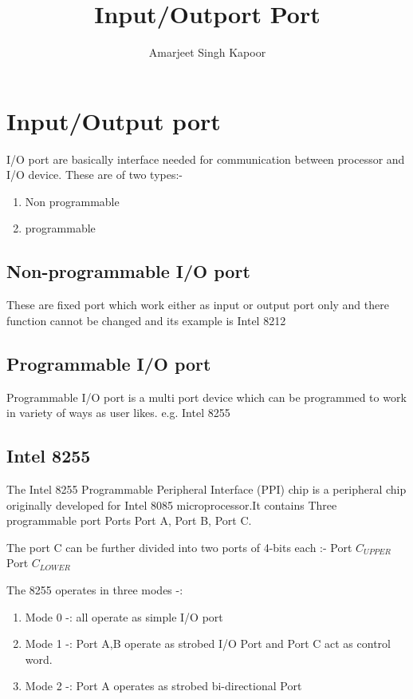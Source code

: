 \documentclass[12pt]{report}
\title{Input/Outport Port}
\author{Amarjeet Singh Kapoor}
\begin{document}
\thispagestyle{plain}
	\begin{titlepage}
\maketitle
	\end{titlepage}

\chapter{Input/Output port}
 I/O port are basically interface needed for communication between processor and I/O device.
These are of two types:-
\begin{enumerate}
\item Non programmable
\item  programmable
\end{enumerate}

\section{Non-programmable I/O port}
These are fixed port which work either as input or output port only and there function cannot be changed and its example is Intel 8212


\section{Programmable I/O port}
Programmable I/O port is a multi port device which can be programmed to work in variety of ways as user likes. e.g. Intel 8255   

\section{Intel 8255} 
The Intel 8255 Programmable Peripheral Interface (PPI) chip is a peripheral chip originally developed for Intel 8085 microprocessor.It contains Three programmable port Ports Port A, Port B, Port C. 


The port C can be further divided into two ports of 4-bits each :- 
	 Port $C_{{UPPER}}$ Port $C_{{LOWER}}$

The 8255 operates in three modes -:
\begin{enumerate}
\item {Mode 0 -: all operate as simple I/O port }
\item {Mode 1 -: Port A,B operate as strobed I/O Port and Port C 
				act as control word.}
\item	{Mode 2 -: Port A operates as strobed bi-directional Port } \end{enumerate}
		 
\end{document}
